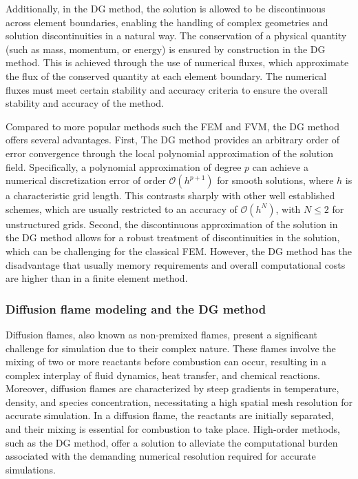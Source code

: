 Additionally, in the DG method, the solution is allowed to be discontinuous across element boundaries, enabling the handling of complex geometries and solution discontinuities in a natural way. The conservation of a physical quantity (such as mass, momentum, or energy)  is ensured by construction in the DG method. This is achieved through the use of numerical fluxes, which approximate the flux of the conserved quantity at each element boundary. The numerical fluxes must meet certain stability and accuracy criteria to ensure the overall stability and accuracy of the method. 


Compared to more popular methods such the \gls{FEM} and \gls{FVM}, the DG method offers several advantages. First, The DG method provides an arbitrary order of error convergence through the local polynomial approximation of the solution field. Specifically, a polynomial approximation of degree $p$ can achieve a numerical discretization error of order $\mathcal{O}(h^{p+1})$ for smooth solutions, where $h$ is a characteristic grid length. This contrasts sharply with other well established schemes, which are usually restricted to an accuracy of $\mathcal{O}(h^N)$, with $N \leq 2$ for unstructured grids. Second, the discontinuous approximation of the solution in the DG method allows for a robust treatment of discontinuities in the solution, which can be challenging for the classical \gls{FEM}. However, the DG method has the disadvantage that usually memory requirements  and overall computational costs are higher than in a finite element method.

\subsubsection{Diffusion flame modeling and the \Gls{DG} method}
Diffusion flames, also known as non-premixed flames, present a significant challenge for simulation due to their complex nature. These flames involve the mixing of two or more reactants before combustion can occur, resulting in a complex interplay of fluid dynamics, heat transfer, and chemical reactions. Moreover, diffusion flames are characterized by steep gradients in temperature, density, and species concentration, necessitating a high spatial mesh resolution for accurate simulation. In a diffusion flame, the reactants are initially separated, and their mixing is essential for combustion to take place. High-order methods, such as the DG method, offer a solution to alleviate the computational burden associated with the demanding numerical resolution required for accurate simulations.
 
